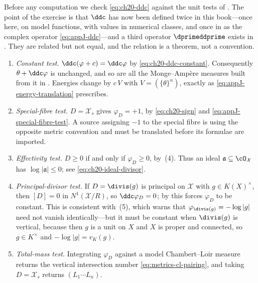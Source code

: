 Before any computation we check \eqref{eq:ch20-ddc} against the unit tests
of .  The point of the exercise is that
$\ddc$ has now been defined twice in this book---once here, on model
functions, with values in numerical classes, and once in
 as the complex operator
\eqref{eq:appJ-ddc}---and a third operator $\dprimeddprime$ exists in
.  They are related but not equal, and the relation is a
theorem, not a convention.

\begin{enumerate}
\item \emph{Constant test.}  $\ddc(\varphi+c)=\ddc\varphi$ by
 \eqref{eq:ch20-ddc-constant}.  Consequently
 $\theta+\ddc\varphi$ is unchanged, and so are all the Monge--Amp\`ere
 measures built from it in .  Energies change by
 $c\,V$ with $V=(\{\theta\}^n)$, exactly as
 \eqref{eq:appJ-energy-translation} prescribes.
\item \emph{Special-fibre test.}  $D=\mathcal X_s$ gives
 $\varphi_D=+1$, by \eqref{eq:ch20-sign} and
 \eqref{eq:appJ-special-fibre-test}.  A source assigning $-1$ to the
 special fibre is using the opposite metric convention and must be
 translated before its formulae are imported.
\item \emph{Effectivity test.}  $D\geq0$ if and only if
 $\varphi_D\geq0$, by
 \,(4).  Thus an ideal
 $\mathfrak a\subseteq\cO_{\mathcal X}$ has
 $\log|\mathfrak a|\leq0$; see \eqref{eq:ch20-ideal-divisor}.
\item \emph{Principal-divisor test.}  If $D=\divis(g)$ is principal on
 $\mathcal X$ with $g\in K(X)^\times$, then $[D]=0$ in
 $N^1(\mathcal X/R)$, so $\ddc\varphi_D=0$; by
  this forces $\varphi_D$ to be constant.  This
 is consistent with \,(5), which
 warns that $\varphi_{\divis(g)}=-\log|g|$ need not vanish
 identically---but it must be constant when $\divis(g)$ is vertical,
 because then $g$ is a unit on $X$ and $X$ is proper and connected, so
 $g\in K^\times$ and $-\log|g|=v_K(g)$.
\item \emph{Total-mass test.}  Integrating $\varphi_D$ against a model
 Chambert--Loir measure returns the vertical intersection number
 \eqref{eq:metrics-cl-pairing}, and taking $D=\mathcal X_s$ returns
 $(L_1\cdots L_n)$.
\end{enumerate}

